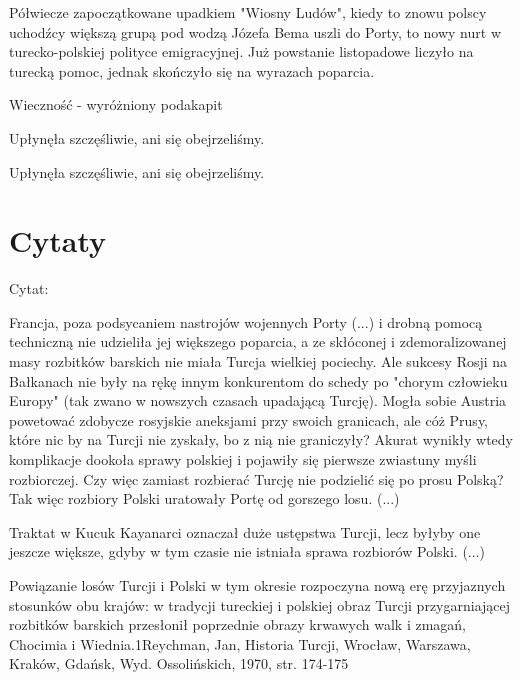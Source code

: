 Półwiecze zapoczątkowane upadkiem "Wiosny Ludów", kiedy to znowu polscy
uchodźcy większą grupą pod wodzą Józefa Bema uszli do Porty, to nowy
nurt w turecko-polskiej polityce emigracyjnej. Już powstanie listopadowe
liczyło na turecką pomoc, jednak skończyło się na wyrazach poparcia.

Wieczność - wyróżniony podakapit

Upłynęła szczęśliwie, ani się obejrzeliśmy.

Upłynęła szczęśliwie, ani się obejrzeliśmy.


\section*{Cytaty}

Cytat:

Francja, poza podsycaniem nastrojów wojennych Porty (...) i drobną
pomocą techniczną nie udzieliła jej większego poparcia, a ze skłóconej i
zdemoralizowanej masy rozbitków barskich nie miała Turcja wielkiej
pociechy. Ale sukcesy Rosji na Bałkanach nie były na rękę innym
konkurentom do schedy po "chorym człowieku Europy" (tak zwano w nowszych
czasach upadającą Turcję). Mogła sobie Austria powetować zdobycze
rosyjskie aneksjami przy swoich granicach, ale cóż Prusy, które nic by
na Turcji nie zyskały, bo z nią nie graniczyły? Akurat wynikły wtedy
komplikacje dookoła sprawy polskiej i pojawiły się pierwsze zwiastuny
myśli rozbiorczej. Czy więc zamiast rozbierać Turcję nie podzielić się
po prosu Polską? Tak więc rozbiory Polski uratowały Portę od gorszego
losu. (...)

Traktat w Kucuk Kayanarci oznaczał duże ustępstwa Turcji, lecz byłyby
one jeszcze większe, gdyby w tym czasie nie istniała sprawa rozbiorów
Polski. (...)

Powiązanie losów Turcji i Polski w tym okresie rozpoczyna nową erę
przyjaznych stosunków obu krajów: w tradycji tureckiej i polskiej obraz
Turcji przygarniającej rozbitków barskich przesłonił poprzednie obrazy
krwawych walk i zmagań, Chocimia i Wiednia.1Reychman, Jan, Historia
Turcji, Wrocław, Warszawa, Kraków, Gdańsk, Wyd. Ossolińskich, 1970, str.
174-175
